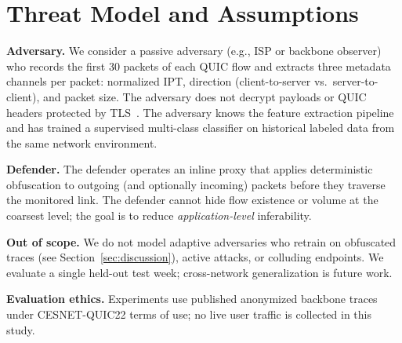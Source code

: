 \section{Threat Model and Assumptions}
\label{sec:threat}

\textbf{Adversary.}
We consider a passive adversary (e.g., ISP or backbone observer) who records the
first 30 packets of each QUIC flow and extracts three metadata channels per packet:
normalized IPT, direction (client-to-server vs.\ server-to-client), and packet size.
The adversary does not decrypt payloads or QUIC headers protected by TLS~\cite{rfc9000}.
The adversary knows the feature extraction pipeline and has trained a supervised
multi-class classifier on historical labeled data from the same network environment.

\textbf{Defender.}
The defender operates an inline proxy that applies deterministic obfuscation to
outgoing (and optionally incoming) packets before they traverse the monitored link.
The defender cannot hide flow existence or volume at the coarsest level; the goal is
to reduce \emph{application-level} inferability.

\textbf{Out of scope.}
We do not model adaptive adversaries who retrain on obfuscated traces (see
Section~\ref{sec:discussion}), active attacks, or colluding endpoints. We evaluate a
single held-out test week; cross-network generalization is future work.

\textbf{Evaluation ethics.}
Experiments use published anonymized backbone traces under CESNET-QUIC22 terms of use;
no live user traffic is collected in this study.

